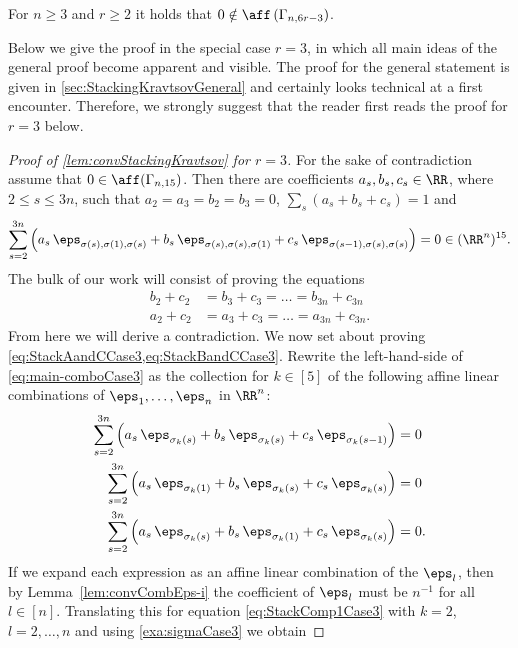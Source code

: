 \begin{lem}\label{lem:convStackingKravtsov}
For $n \geq 3$ and $r \geq 2$ it holds that $0 \notin \aff \left( \Gamma_{n, 6 r - 3} \right)$.
\end{lem}

Below we give the proof in the special case $r=3$, in which all main ideas of the general proof become apparent and visible. The proof for the general statement is given in \cref{sec:StackingKravtsovGeneral} and certainly looks technical at a first encounter. Therefore, we strongly suggest that the reader first reads the proof for $r=3$ below. 



\begin{proof}[Proof of \cref{lem:convStackingKravtsov} for $r=3$]
For the sake of contradiction assume that $0 \in \aff(\Gamma_{n, 15})$. Then there are coefficients $a_s, b_s, c_s \in \RR$, where $2 \leq s \leq 3 n$, such that $a_2 = a_3 = b_2 = b_3 = 0$, $\sum_s (a_s + b_s + c_s) = 1$ and
	\begin{align}
	\sum_{s= 2}^{3 n} \left( a_s \, \eps_{\sigma(s),\sigma(1),\sigma(s)}
	+ b_s \, \eps_{\sigma(s),\sigma(s),\sigma(1)} + c_s \, \eps_{\sigma(s-1),\sigma(s),\sigma(s)}  \right) = 0 \in (\RR^n)^{15}.\label{eq:main-comboCase3}
	\end{align}
	The bulk of our work will consist of proving the equations
	\begin{align}\label{eq:StackBandCCase3}
	b_2 + c_2 &= b_3 + c_3 = \ldots = b_{3 n} + c_{3 n}\\
	\label{eq:StackAandCCase3} a_2 + c_2 &= a_3 + c_3 = \ldots = a_{3 n} + c_{3 n}.
	\end{align}
	From here we will derive a contradiction. We now set about proving \cref{eq:StackAandCCase3,eq:StackBandCCase3}. Rewrite the left-hand-side of \cref{eq:main-comboCase3} as the collection for $k \in [5]$ of the following affine linear combinations of $\eps_1,\ldots,\eps_n$ in $\RR^n$:
	\begin{align}
	\sum_{s= 2}^{3n} \left( a_s \, \eps_{\sigma_k(s)} 
	+ b_s \, \eps_{\sigma_k(s)} + c_s \, \eps_{\sigma_k(s-1)}  \right) &= 0 \label{eq:StackComp1Case3}\\
	\sum_{s= 2}^{3n} \left( a_s \, \eps_{\sigma_k(1)}
	+ b_s \, \eps_{\sigma_k(s)} + c_s \, \eps_{\sigma_k(s)}  \right) &= 0 \label{eq:StackComp2Case3} \\
	\sum_{s= 2}^{3n} \left( a_s \, \eps_{\sigma_k(s)}
	+ b_s \, \eps_{\sigma_k(1)} + c_s \, \eps_{\sigma_k(s)}  \right) &= 0. \label{eq:StackComp3Case3}
	\end{align}
If we expand each expression as an affine linear combination of the $\eps_l$, then by Lemma~\ref{lem:convCombEps-i} the coefficient of $\eps_l$ must be $n^{-1}$ for all $l \in [n]$. Translating this for equation \eqref{eq:StackComp1Case3} with $k = 2$, $l=2,\ldots,n$ and using \cref{exa:sigmaCase3} we obtain 



\end{proof}
